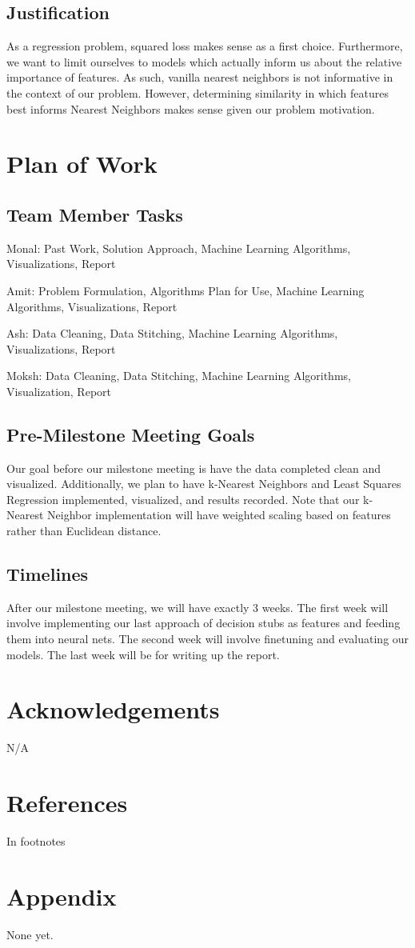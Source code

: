 \documentclass{article}
\begin{document}
\begin{multicols}{2}
\subsection{Justification} As a regression problem, squared loss makes sense as a first choice. Furthermore, we want to limit ourselves to models which actually inform us about the relative importance of features. As such, vanilla nearest neighbors is not informative in the context of our problem. However, determining similarity in which features best informs Nearest Neighbors makes sense given our problem motivation.

\section{Plan of Work}
\subsection{Team Member Tasks} 

Monal: Past Work, Solution Approach, Machine Learning Algorithms, Visualizations, Report

Amit: Problem Formulation, Algorithms Plan for Use, Machine Learning Algorithms, Visualizations, Report

Ash: Data Cleaning, Data Stitching, Machine Learning Algorithms, Visualizations, Report

Moksh: Data Cleaning, Data Stitching, Machine Learning Algorithms, Visualization, Report

\subsection{Pre-Milestone Meeting Goals} 

Our goal before our milestone meeting is have the data completed clean and visualized. Additionally, we plan to have k-Nearest Neighbors and Least Squares Regression implemented, visualized, and results recorded. Note that our k-Nearest Neighbor implementation will have weighted scaling based on features rather than Euclidean distance.

\subsection{Timelines}

After our milestone meeting, we will have exactly 3 weeks. The first week will involve implementing our last approach of decision stubs as features and feeding them into neural nets. The second week will involve finetuning and evaluating our models. The last week will be for writing up the report.

\section{Acknowledgements} N/A

\end{multicols}

\pagebreak

\section{References} In footnotes

\section{Appendix} None yet.
\end{document}
